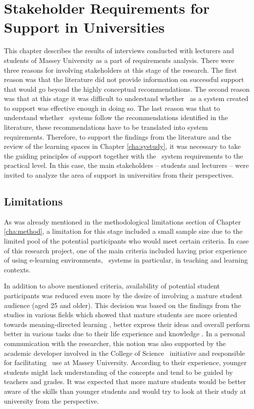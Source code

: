 \chapter[Stakeholder Requirements for \LLLc Support ]{Stakeholder Requirements
for \LLLc Support in Universities\label{cha:model}}
This chapter describes the results of interviews conducted with lecturers and
students of Massey University as a part of \LLLs requirements analysis. There
were three reasons for involving stakeholders at this stage of the research. The
first reason was that the literature did not provide information on successful
\LLLs support that would go beyond the highly conceptual recommendations. The
second reason was that at this stage it was difficult to understand whether
\ep~as a system created to support \LLLs was effective enough in doing so. The
last reason was that to understand whether \ep~systems follow the
recommendations identified in the literature, these recommendations have to be
translated into system requirements. Therefore, to support the findings from the
literature and the review of the learning spaces in Chapter \ref{cha:systudy},
it was necessary to take the guiding principles of \LLLs support together with
the \ep~system requirements to the practical level. In this case, the main
stakeholders -- students and lecturers -- were invited to analyze the area of
\LLLs support in universities from their perspectives.

\section{Limitations}

As was already mentioned in the methodological limitations section of Chapter
\ref{cha:method}, a limitation for this stage included a small sample size due
to the limited pool of the potential participants who would meet certain
criteria. In case of this research project, one of the main criteria included
having prior experience of using e-learning environments, \ep~systems in
particular, in teaching and learning contexts.

In addition to above mentioned criteria, availability of potential student
participants was reduced even more by the desire of involving a mature student
audience (aged 25 and older). This decision was based on the findings from the
studies in various fields which showed that mature students are more oriented
towards meaning-directed learning \citep{Smith2010}, better express their ideas
\citep{Lea2010} and overall perform better in various tasks due to their life
experience and knowledge \citep{Sherwood1987}. In a personal communication with
the researcher, this notion was also supported by the academic developer
involved in the College of Science \ep~initiative and responsible for
facilitating \ep~use at Massey University. According to their experience,
younger students might lack understanding of the \LLLs concepts and tend to be
guided by teachers and grades. It was expected that more mature students would
be better aware of the \LLLs skills than younger students and would try to look
at their study at university from the \LLLs perspective.

